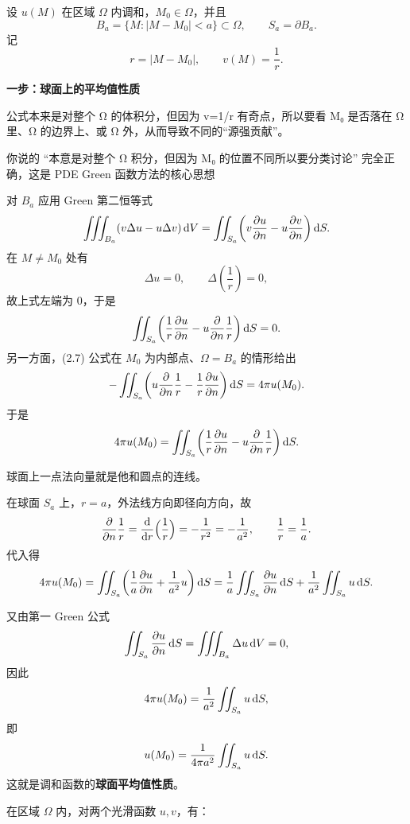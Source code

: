 \begin{solution}
设 $u(M)$ 在区域 $\Omega$ 内调和，$M_0\in\Omega$，并且
\[
B_a=\{M:|M-M_0|<a\}\subset\Omega,\qquad S_a=\partial B_a.
\]
记
\[
r=|M-M_0|,\qquad v(M)=\frac1r.
\]

\medskip
\noindent\textbf{一步：球面上的平均值性质}
\begin{dxtips}
    
公式本来是对整个 Ω 的体积分，但因为 v=1/r 有奇点，所以要看 M₀ 是否落在 Ω 里、Ω 的边界上、或 Ω 外，从而导致不同的“源强贡献”。

你说的 “本意是对整个 Ω 积分，但因为 M₀ 的位置不同所以要分类讨论” 完全正确，这是 PDE Green 函数方法的核心思想
\end{dxtips}
对 $B_a$ 应用 Green 第二恒等式
\[
\iiint_{B_a} (v\Delta u-u\Delta v)\,{\rm d}V
=\iint_{S_a}\!\left(
  v\frac{\partial u}{\partial n}
  -u\frac{\partial v}{\partial n}
\right){\rm d}S .
\]
在 $M\ne M_0$ 处有
\[
\Delta u=0,\qquad \Delta\!\left(\frac1r\right)=0,
\]
故上式左端为 $0$，于是
\begin{equation}\label{eq:GaussBall}
\iint_{S_a}\!\left(
  \frac1r\frac{\partial u}{\partial n}
  -u\frac{\partial}{\partial n}\frac1r
\right){\rm d}S =0 .
\end{equation}
另一方面，(2.7) 公式在 $M_0$ 为内部点、$\Omega=B_a$ 的情形给出
\[
-\iint_{S_a}\!\left(
  u\frac{\partial}{\partial n}\frac1r
  -\frac1r\frac{\partial u}{\partial n}
\right){\rm d}S
=4\pi u(M_0).
\]
于是
\[
4\pi u(M_0)
=\iint_{S_a}\!\left(
  \frac1r\frac{\partial u}{\partial n}
  -u\frac{\partial}{\partial n}\frac1r
\right){\rm d}S .
\]
\begin{dxtips}
    球面上一点法向量就是他和圆点的连线。
\end{dxtips}
在球面 $S_a$ 上，$r=a$，外法线方向即径向方向，故
\[
\frac{\partial}{\partial n}\frac1r
=\frac{{\rm d}}{{\rm d}r}\Bigl(\frac1r\Bigr)
=-\frac1{r^2}=-\frac1{a^2},\qquad
\frac1r=\frac1a.
\]
代入得
\[
4\pi u(M_0)
=\iint_{S_a}\!\left(
  \frac1a\frac{\partial u}{\partial n}
  +\frac{1}{a^2}u
\right){\rm d}S
=\frac1a\iint_{S_a}\frac{\partial u}{\partial n}\,{\rm d}S
 +\frac1{a^2}\iint_{S_a}u\,{\rm d}S.
\]

又由第一 Green 公式
\[
\iint_{S_a}\frac{\partial u}{\partial n}\,{\rm d}S
=\iiint_{B_a}\Delta u\,{\rm d}V = 0,
\]
因此
\[
4\pi u(M_0)
=\frac1{a^2}\iint_{S_a}u\,{\rm d}S,
\]
即
\begin{equation}\label{eq:sphere-mean}
u(M_0)=\frac{1}{4\pi a^2}\iint_{S_a}u\,{\rm d}S.
\end{equation}
这就是调和函数的\textbf{球面平均值性质}。
\begin{dxtips}
    在区域 $\Omega$ 内，对两个光滑函数 $u,v$，有：


\end{dxtips}
\end{solution}
